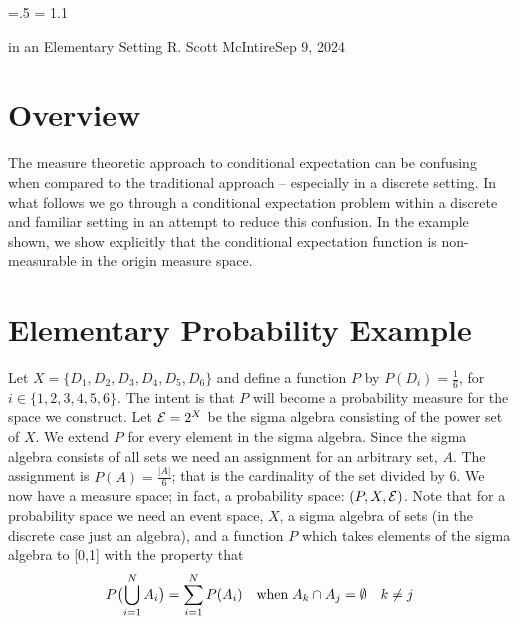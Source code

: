 




\parindent=0pt
\parskip=.5\baselineskip
\baselineskip = 1.1\baselineskip

\footline{\hss\tenrm\folio\hss}

        {in an Elementary Setting}
{R. Scott McIntire}{Sep 9, 2024}

\section{Overview}
The measure theoretic approach to conditional expectation can be confusing
when compared to the traditional approach -- especially in a discrete 
setting. In what follows we go through a conditional 
expectation problem within a discrete and familiar setting in an attempt 
to reduce this confusion. In the example shown, we show explicitly that the 
conditional expectation function is non-measurable in the origin 
measure space.


\section{Elementary Probability Example}
Let $X = \{D_1, D_2, D_3, D_4, D_5, D_6\}$ and define a function $P$ by 
$P(D_i) = \frac{1}{6}$, for $i\in \{1,2,3,4,5,6\}$. The intent is that $P$ will 
become a probability measure for the space we construct.
Let ${\cal E} = 2^X$ be the sigma  algebra 
consisting of the power set of $X$. We extend $P$ for every element in the sigma algebra.
Since the sigma algebra consists of all sets 
we need an assignment for an arbitrary set, $A$. 
The assignment is $P(A) = \frac{|A|}{6}$; that is the cardinality of the set divided by 6.
We now have a measure space; in fact, a probability space: $(P,X,{\cal E})$.
Note that for a probability space we need an event space, $X$, a sigma algebra of sets 
(in the discrete case just an algebra), and a function $P$ which takes 
elements of the sigma algebra to [0,1] with the property that 
$$
P\bigl(\mathop{\bigcup}_{i=1}^N A_i\bigr) = \sum_{i=1}^N P(A_i) 
\quad {\rm when}\;  A_k \cap A_j = \emptyset \quad k\neq j
$$

